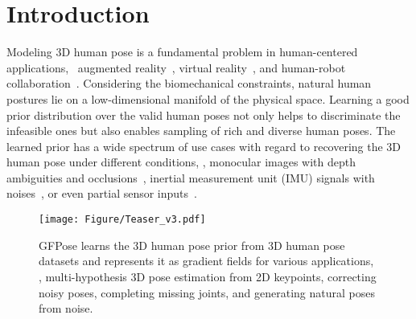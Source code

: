 \documentclass[10pt,twocolumn,letterpaper]{article}
\begin{document}
\section{Introduction}
\label{sec:introduction}
Modeling 3D human pose is a fundamental problem in human-centered applications, \eg \ augmented reality~\cite{lin2010augmented, murphy2010head}, virtual reality~\cite{ahuja2019mecap, yang2022hybridtrak, mehta2017vnect}, and human-robot collaboration~\cite{cheng2021human, gao2019dual, liu2021collision}. Considering the biomechanical constraints, natural human postures lie on a low-dimensional manifold of the physical space. Learning a good prior distribution over the valid human poses not only helps to discriminate the infeasible ones but also enables sampling of rich and diverse human poses. The learned prior has a wide spectrum of use cases with regard to recovering the 3D human pose under different conditions, \eg, monocular images with depth ambiguities and occlusions~\cite{cheng2019occlusion, wehrbein2021probabilistic}, inertial measurement unit (IMU) signals with noises~\cite{zhang2020fusing}, or even partial sensor inputs~\cite{winkler2022questsim, jiang2022avatarposer}.













\begin{figure}[!t]
    \centering
    \texttt{[image: Figure/Teaser\_v3.pdf]}
        \caption{GFPose learns the 3D human pose prior from 3D human pose datasets and represents it as gradient fields for various applications, \eg, multi-hypothesis 3D pose estimation from 2D keypoints, correcting noisy poses, completing missing joints, and generating natural poses from noise.}
    \label{fig:teaser}
    \vspace{-1.0em}
\end{figure}
\end{document}
